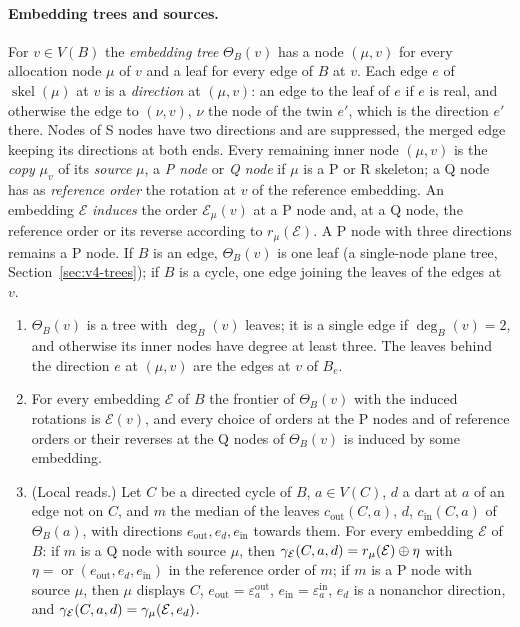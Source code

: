 \paragraph{Embedding trees and sources.}
For $v\in V(B)$ the \emph{embedding tree} $\Theta_B(v)$ has a node $(\mu,v)$
for every allocation node $\mu$ of $v$ and a leaf for every edge of $B$ at
$v$. Each edge $e$ of $\operatorname{skel}(\mu)$ at $v$ is a
\emph{direction} at $(\mu,v)$: an edge to the leaf of $e$ if $e$ is real,
and otherwise the edge to $(\nu,v)$, $\nu$ the node of the twin $e'$, which
is the direction $e'$ there. Nodes of S nodes have two directions and are
suppressed, the merged edge keeping its directions at both ends. Every
remaining inner node $(\mu,v)$ is the \emph{copy} $\mu_v$ of its
\emph{source} $\mu$, a
\emph{P node} or \emph{Q node} if $\mu$ is a P or R skeleton; a Q node has
as \emph{reference order} the rotation at $v$ of the reference embedding. An embedding $\mathcal E$ \emph{induces} the
order $\mathcal E_\mu(v)$ at a P node and, at a Q node, the reference order
or its reverse according to $r_\mu(\mathcal E)$. A P node with three
directions remains a P node. If $B$ is an edge, $\Theta_B(v)$ is one leaf (a single-node plane tree,
Section~\ref{sec:v4-trees}); if $B$ is a cycle, one edge joining the leaves
of the edges at $v$.

\begin{lemma}[frontier]\label{lem:v4-frontier}
\begin{enumerate}[label=(\alph*),nosep]
\item $\Theta_B(v)$ is a tree with $\deg_B(v)$ leaves; it is a single edge
if $\deg_B(v)=2$, and otherwise its inner nodes have degree at least three.
The leaves behind the direction $e$ at $(\mu,v)$ are the edges at $v$ of
$B_e$.
\item For every embedding $\mathcal E$ of $B$ the frontier of
$\Theta_B(v)$ with the induced rotations is $\mathcal E(v)$, and every
choice of orders at the P nodes and of reference orders or their reverses
at the Q nodes of $\Theta_B(v)$ is induced by some embedding.
\item (Local reads.) Let $C$ be a directed cycle of $B$, $a\in V(C)$, $d$
a dart at $a$ of an edge not on $C$, and $m$ the median of the leaves
$c_{\mathrm{out}}(C,a)$, $d$, $c_{\mathrm{in}}(C,a)$ of $\Theta_B(a)$, with
directions $e_{\mathrm{out}},e_d,e_{\mathrm{in}}$ towards them. For every
embedding $\mathcal E$ of $B$: if $m$ is a Q node with source $\mu$, then
$\gamma_{\mathcal E}(C,a,d)=r_\mu(\mathcal E)\oplus\eta$ with
$\eta=\operatorname{or}(e_{\mathrm{out}},e_d,e_{\mathrm{in}})$ in the
reference order of $m$; if $m$ is a P node with source $\mu$, then $\mu$
displays $C$, $e_{\mathrm{out}}=\varepsilon^{\mathrm{out}}_a$,
$e_{\mathrm{in}}=\varepsilon^{\mathrm{in}}_a$, $e_d$ is a nonanchor
direction, and $\gamma_{\mathcal E}(C,a,d)=\gamma_\mu(\mathcal E,e_d)$.
\end{enumerate}
\end{lemma}

